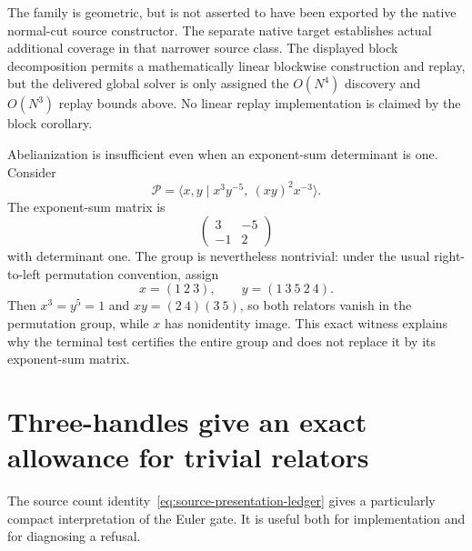 The family is geometric, but is not asserted to have been exported by
the native normal-cut source constructor.  The separate native target
establishes actual additional coverage in that narrower source class.
The displayed block decomposition permits a mathematically linear
blockwise construction and replay, but the delivered global solver is
only assigned the $O(N^4)$ discovery and $O(N^3)$ replay bounds above.
No linear replay implementation is claimed by the block corollary.

Abelianization is insufficient even when an exponent-sum determinant is
one.  Consider
\[
 \mathcal P=\langle x,y\mid x^3y^{-5},\ (xy)^2x^{-3}\rangle.
\]
The exponent-sum matrix is
\[
 \begin{pmatrix}3&-5\\-1&2\end{pmatrix}
\]
with determinant one.  The group is nevertheless nontrivial: under the
usual right-to-left permutation convention, assign
\[
 x=(1\ 2\ 3),\qquad y=(1\ 3\ 5\ 2\ 4).
\]
Then $x^3=y^5=1$ and $xy=(2\ 4)(3\ 5)$, so both relators vanish in
the permutation group, while $x$ has nonidentity image.  This exact
witness explains why the terminal test certifies the entire group and
does not replace it by its exponent-sum matrix.

\section{Three-handles give an exact allowance for trivial relators}
\label{sec:relator-allowance}

The source count identity~\eqref{eq:source-presentation-ledger} gives a
particularly compact interpretation of the Euler gate.  It is useful
both for implementation and for diagnosing a refusal.

